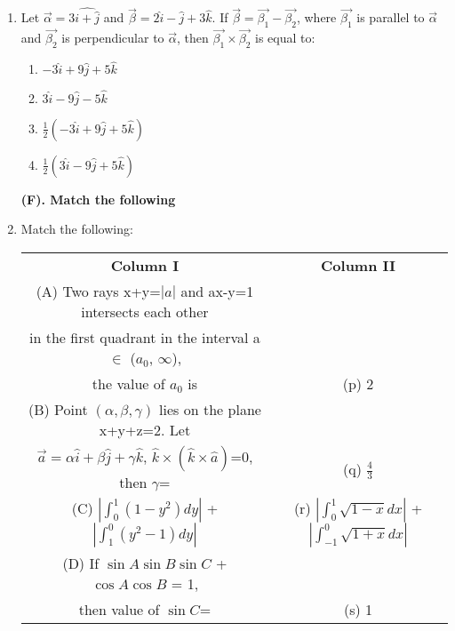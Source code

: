 \begin{enumerate}[label=\arabic*.,ref=\thesubsection.\theenumi]
\item Let $\overrightarrow{\alpha} = 3\hat{i + \hat{j}}$ and $\overrightarrow{\beta} = 2\hat{i} - \hat{j} + 3\hat{k}$. If $\overrightarrow{\beta} = \overrightarrow{\beta_1} - \overrightarrow{\beta_2}$, where $\overrightarrow{\beta_1}$ is parallel to $\overrightarrow{\alpha}$ and $\overrightarrow{\beta_2}$ is perpendicular to $\overrightarrow{\alpha}$, then $\overrightarrow{\beta_1} \times \overrightarrow{\beta_2}$ is equal to:
\begin{enumerate}
\item $-3\hat{i} + 9\hat{j} + 5\hat{k}$
\item $3\hat{i} - 9\hat{j} - 5\hat{k}$
\item $\frac{1}{2}(-3\hat{i} + 9\hat{j} + 5\hat{k})$
\item $\frac{1}{2}(3\hat{i} - 9\hat{j} + 5\hat{k})$
\end{enumerate}

\clearpage
\textbf{(F). Match the following}

\item Match the following:
\begin{table}[ht!]
\centering
\begin{tabular}{c c} 
 \textbf{Column I} & \textbf{Column II}\\ [0.5ex] 
 (A) Two rays x+y=$|a|$ and ax-y=1
  intersects each other\\ in the first
  quadrant in the interval a 
  $\in$ ($a_0$, $\infty$), \\
  the value of $a_0$ is                                               &(p) 2\\ 
 (B) Point $(\alpha,\beta,\gamma)$ lies on the plane x+y+z=2. 
 Let\\ $\overrightarrow{a}=\alpha\hat{i}+\beta\hat{j}+\gamma\hat{k}$, 
 $\hat{k} \times (\hat{k} \times \hat{a})$=0, then $\gamma$=          &(q) $\frac{4}{3}$\\
 (C) $|\int_{0}^{1}(1-y^{2})dy|$ 
 + $|\int_{1}^{0}(y^{2}-1)dy|$                                        &(r) $|\int_{0}^{1}\sqrt{1-x}dx|$
                                                                           +$|\int_{-1}^{0}\sqrt{1+x}dx|$\\
 (D) If $\sin A \sin B \sin C$ + $\cos A \cos B$ = 1,\\ 
 then value of $\sin C$=                                              &(s) 1\\[1ex] 
\end{tabular}
\end{table}\\


\end{enumerate}
